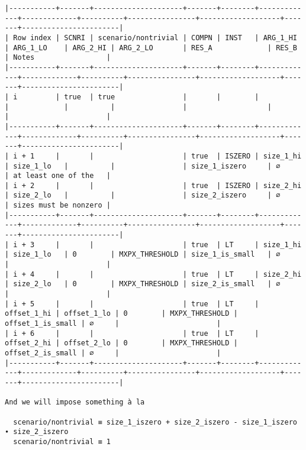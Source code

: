 \documentclass[varwidth=\maxdimen,margin=0.5cm,multi={verbatim}]{standalone}
\begin{document}
\begin{verbatim}
|-----------+-------+---------------------+-------+--------+-------------+-------------+----------+----------------+-------------------+-------+-----------------------|
| Row index | SCNRI | scenario/nontrivial | COMPN | INST   | ARG_1_HI    | ARG_1_LO    | ARG_2_HI | ARG_2_LO       | RES_A             | RES_B | Notes                 |
|-----------+-------+---------------------+-------+--------+-------------+-------------+----------+----------------+-------------------+-------+-----------------------|
| i         | true  | true                |       |        |             |             |          |                |                   |       |                       |
|-----------+-------+---------------------+-------+--------+-------------+-------------+----------+----------------+-------------------+-------+-----------------------|
| i + 1     |       |                     | true  | ISZERO | size_1_hi   | size_1_lo   |          |                | size_1_iszero     | ∅     | at least one of the   |
| i + 2     |       |                     | true  | ISZERO | size_2_hi   | size_2_lo   |          |                | size_2_iszero     | ∅     | sizes must be nonzero |
|-----------+-------+---------------------+-------+--------+-------------+-------------+----------+----------------+-------------------+-------+-----------------------|
| i + 3     |       |                     | true  | LT     | size_1_hi   | size_1_lo   | 0        | MXPX_THRESHOLD | size_1_is_small   | ∅     |                       |
| i + 4     |       |                     | true  | LT     | size_2_hi   | size_2_lo   | 0        | MXPX_THRESHOLD | size_2_is_small   | ∅     |                       |
| i + 5     |       |                     | true  | LT     | offset_1_hi | offset_1_lo | 0        | MXPX_THRESHOLD | offset_1_is_small | ∅     |                       |
| i + 6     |       |                     | true  | LT     | offset_2_hi | offset_2_lo | 0        | MXPX_THRESHOLD | offset_2_is_small | ∅     |                       |
|-----------+-------+---------------------+-------+--------+-------------+-------------+----------+----------------+-------------------+-------+-----------------------|

And we will impose something à la

  scenario/nontrivial ≡ size_1_iszero + size_2_iszero - size_1_iszero ∙ size_2_iszero
  scenario/nontrivial ≡ 1

\end{verbatim}
\end{document}
